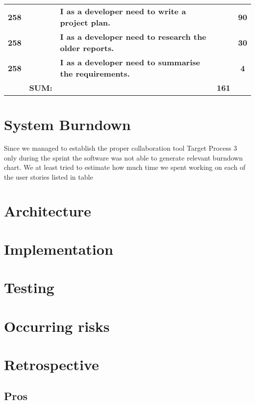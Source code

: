 \begin{table*}[!h]
\begin{tabularx}{\textwidth}{ccXcc}
\textbf{258} 	&
	& \textbf{I as a developer need to write a project plan.} 						&  			& \textbf{90} \\

\textbf{258} 	&
	& \textbf{I as a developer need to research the older reports.} 						&  			& \textbf{30} \\

\textbf{258} 	&
	& \textbf{I as a developer need to summarise the requirements.} 						&  			& \textbf{4} \\
\midrule
				& \textbf{SUM:}		&			& \textbf{161}
 \\																			
\bottomrule[1mm]

\end{tabularx}
\end{table*}

\section{System Burndown}
Since we managed to establish the proper collaboration tool Target Process 3 only during the sprint the software was not able to generate relevant burndown chart. We at least tried to estimate how much time we spent working on each of the user stories listed in table



\section{Architecture}
\section{Implementation}
\section{Testing}
\section{Occurring risks}
\section{Retrospective}
\subsection{Pros}
